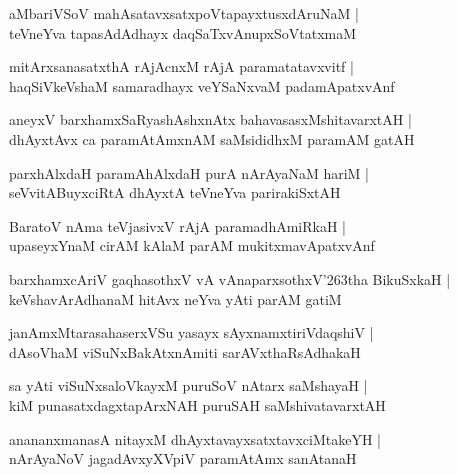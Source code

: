 \documentclass[twoside,12pt,openright]{book}
\def\S{\char'263}
\newcounter{shloka}[chapter]
\begin{document}
\begin{shloka}%
aMbariVSoV mahAsatavxsatxpoVtapayxtusxdAruNaM |\\
teVneYva tapasAdAdhayx daqSaTxvAnupxSoVtatxmaM
\end{shloka}

\begin{shloka}%
mitArxsanasatxthA rAjAcnxM rAjA paramatatavxvitf |\\
haqSiVkeVshaM samaradhayx veYSaNxvaM padamApatxvAnf 
\end{shloka}

\begin{shloka}%
aneyxV barxhamxSaRyashAshxnAtx bahavasasxMshitavarxtAH |\\
dhAyxtAvx ca paramAtAmxnAM saMsididhxM paramAM gatAH 
\end{shloka}

\begin{shloka}%
parxhAlxdaH paramAhAlxdaH purA nArAyaNaM hariM |\\
seVvitABuyxciRtA dhAyxtA teVneYva parirakiSxtAH
\end{shloka}

\begin{shloka}%
BaratoV nAma teVjasivxV rAjA paramadhAmiRkaH |\\
upaseyxYnaM cirAM kAlaM parAM mukitxmavApatxvAnf 
\end{shloka}

\begin{shloka}%
barxhamxcAriV gaqhasothxV vA vAnaparxsothxV\S tha BikuSxkaH |\\
keVshavArAdhanaM hitAvx neYva yAti parAM gatiM 
\end{shloka}

\begin{shloka}%
janAmxMtarasahaserxVSu yasayx sAyxnamxtiriVdaqshiV |\\
dAsoVhaM viSuNxBakAtxnAmiti sarAVxthaRsAdhakaH 
\end{shloka}

\begin{shloka}%
sa yAti viSuNxsaloVkayxM puruSoV nAtarx saMshayaH |\\
kiM punasatxdagxtapArxNAH puruSAH saMshivatavarxtAH 
\end{shloka}

\begin{shloka}%
anananxmanasA nitayxM dhAyxtavayxsatxtavxciMtakeYH |\\
nArAyaNoV jagadAvxyXVpiV paramAtAmx sanAtanaH 
\end{shloka}
\end{document}
